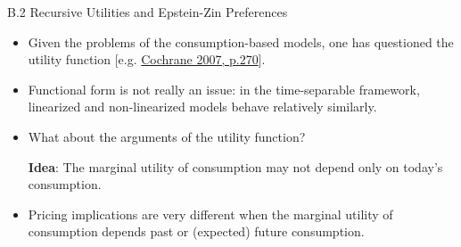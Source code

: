 \begin{frame}{}
\begin{large}
\begin{center}
B.2 Recursive Utilities and Epstein-Zin Preferences
\end{center}
\end{large}
\end{frame}


\begin{frame}{}
\begin{footnotesize}
\begin{itemize}
	\item Given the problems of the consumption-based models, one has questioned the utility function [e.g. \href{http://faculty.chicagobooth.edu/john.cochrane/research/papers/financial_and_real_proofs_aug_07.pdf}{Cochrane 2007, p.270}].
	\item Functional form is not really an issue: in the time-separable framework, linearized and non-linearized models behave relatively similarly.

	\begin{tiny}
		\end{tiny}
	\item What about the arguments of the utility function?
	
	{\bf Idea}: The marginal utility of consumption may not depend only on today's consumption.
	
	\item Pricing implications are very different when the marginal utility of consumption depends past or (expected) future consumption.
\end{itemize}
\end{footnotesize}
\end{frame}



